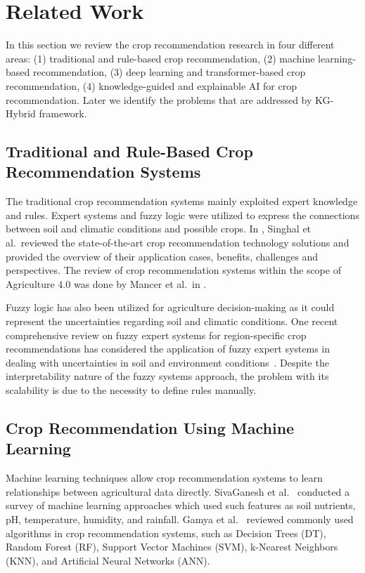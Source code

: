 \documentclass[journal]{IEEEtran}
\begin{document}
\section{Related Work}

In this section we review the crop recommendation research in four different areas: (1) traditional and rule-based crop recommendation, (2) machine learning-based recommendation, (3) deep learning and transformer-based crop recommendation, (4) knowledge-guided and explainable AI for crop recommendation. Later we identify the problems that are addressed by KG-Hybrid framework.

\subsection{Traditional and Rule-Based Crop Recommendation Systems}

The traditional crop recommendation systems mainly exploited expert knowledge and rules. Expert systems and fuzzy logic were utilized to express the connections between soil and climatic conditions and possible crops. In \cite{singhal2025state}, Singhal et al.~reviewed the state-of-the-art crop recommendation technology solutions and provided the overview of their application cases, benefits, challenges and perspectives. The review of crop recommendation systems within the scope of Agriculture 4.0 was done by Mancer et al.~in \cite{mancer2025systematic}.

Fuzzy logic has also been utilized for agriculture decision-making as it could represent the uncertainties regarding soil and climatic conditions. One recent comprehensive review on fuzzy expert systems for region-specific crop recommendations has considered the application of fuzzy expert systems in dealing with uncertainties in soil and environment conditions~\cite{fuzzy2026comprehensive}. Despite the interpretability nature of the fuzzy systems approach, the problem with its scalability is due to the necessity to define rules manually.

\subsection{Crop Recommendation Using Machine Learning}

Machine learning techniques allow crop recommendation systems to learn relationships between agricultural data directly. SivaGanesh et al.~\cite{sivaganesh2026machine} conducted a survey of machine learning approaches which used such features as soil nutrients, pH, temperature, humidity, and rainfall. Gamya et al.~\cite{gamya2025comparative} reviewed commonly used algorithms in crop recommendation systems, such as Decision Trees (DT), Random Forest (RF), Support Vector Machines (SVM), k-Nearest Neighbors (KNN), and Artificial Neural Networks (ANN).
\end{document}

